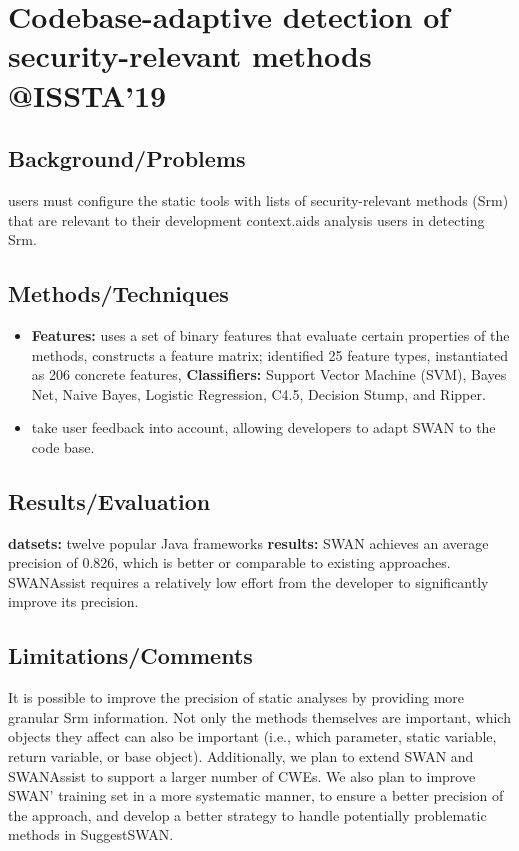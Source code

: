 \section{Codebase-adaptive detection of security-relevant methods @ISSTA'19}
\subsection{Background/Problems}
users must configure the static tools with lists of security-relevant methods (Srm) that are relevant to their development context.aids analysis users in detecting Srm.
\subsection{Methods/Techniques}
\begin{itemize}
	\item \textbf{Features:} uses a set of binary features that evaluate certain properties of the methods, constructs a feature matrix; identified 25 feature types, instantiated as 206 concrete features, \textbf{Classifiers:} Support Vector Machine (SVM), Bayes Net, Naive Bayes, Logistic Regression, C4.5, Decision Stump, and Ripper.
  \item  take user feedback into account, allowing developers to adapt SWAN to the code base.
\end{itemize}

\subsection{Results/Evaluation}
\textbf{datsets:} twelve popular Java frameworks
\textbf{results:} SWAN achieves an average precision of 0.826, which is better or comparable to existing approaches. SWANAssist requires a relatively low effort from the developer to significantly improve its precision.

\subsection{Limitations/Comments}
It is possible to improve the precision of static analyses by providing more granular Srm information. Not only the methods themselves are important, which objects they affect can also be important
(i.e., which parameter, static variable, return variable, or base object). Additionally, we plan to extend SWAN and SWANAssist to support a larger number of CWEs. We also plan to improve SWAN’ training set in a more systematic manner, to ensure a better precision of the approach, and develop a better strategy to handle potentially problematic methods in SuggestSWAN.
\newpage

